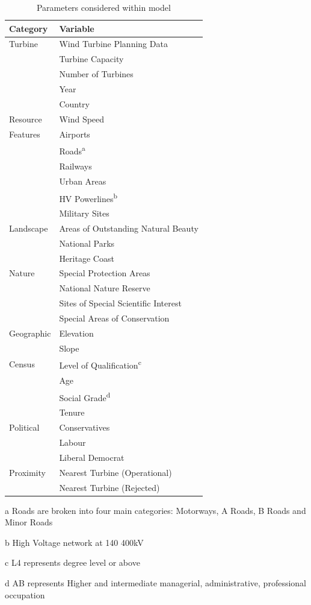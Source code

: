 \documentclass[a4paper,]{article}
\theoremstyle{definition}
\theoremstyle{definition}
\theoremstyle{definition}
\theoremstyle{remark}
\begin{document}
\begin{table}

\begin{threeparttable}
\caption{\label{tab:SummaryTable}Parameters considered within model}
\centering
\begin{tabular}[t]{ll}
\toprule
Category & Variable\\
\midrule
Turbine & Wind Turbine Planning Data\\
 & Turbine Capacity\\
 & Number of Turbines\\
 & Year\\
 & Country\\
Resource & Wind Speed\\
Features & Airports\\
 & Roads\textsuperscript{a}\\
 & Railways\\
 & Urban Areas\\
 & HV Powerlines\textsuperscript{b}\\
 & Military Sites\\
Landscape & Areas of Outstanding Natural Beauty\\
 & National Parks\\
 & Heritage Coast\\
Nature & Special Protection Areas\\
 & National Nature Reserve\\
 & Sites of Special Scientific Interest\\
 & Special Areas of Conservation\\
Geographic & Elevation\\
 & Slope\\
Census & Level of Qualification\textsuperscript{c}\\
 & Age\\
 & Social Grade\textsuperscript{d}\\
 & Tenure\\
Political & Conservatives\\
 & Labour\\
 & Liberal Democrat\\
Proximity & Nearest Turbine (Operational)\\
 & Nearest Turbine (Rejected)\\
\bottomrule
\end{tabular}
\begin{tablenotes}
\small
\item[a] Roads are broken into four main categories: Motorways, A Roads, B Roads and Minor Roads
\item[b] High Voltage network at 140 400kV
\item[c] L4 represents degree level or above
\item[d] AB represents Higher and intermediate managerial, administrative, professional occupation
\end{tablenotes}
\end{threeparttable}
\end{table}
\end{document}
